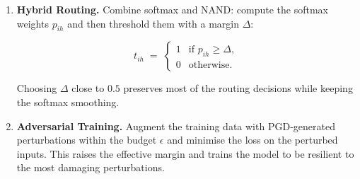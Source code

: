 \begin{enumerate}
\[






\tau_h' \;\sim\; \mathcal{N}(\tau_h,\,\sigma_\tau^2),






\]






where $\sigma_\tau$ is set such that the probability of a flip under typical perturbations is below a target $p_{\text{adv}}$.  The randomness makes it harder for an adversary to predict the exact boundary.













\item \textbf{Hybrid Routing.}  Combine softmax and NAND: compute the softmax weights $p_{ih}$ and then threshold them with a margin $\Delta$:






\[






t_{ih} \;=\;\begin{cases}






1 & \text{if } p_{ih} \ge \Delta,\\






0 & \text{otherwise}.






\end{cases}






\]






Choosing $\Delta$ close to $0.5$ preserves most of the routing decisions while keeping the softmax smoothing.













\item \textbf{Adversarial Training.}  Augment the training data with PGD‑generated perturbations within the budget $\epsilon$ and minimise the loss on the perturbed inputs.  This raises the effective margin and trains the model to be resilient to the most damaging perturbations.






\end{enumerate}
